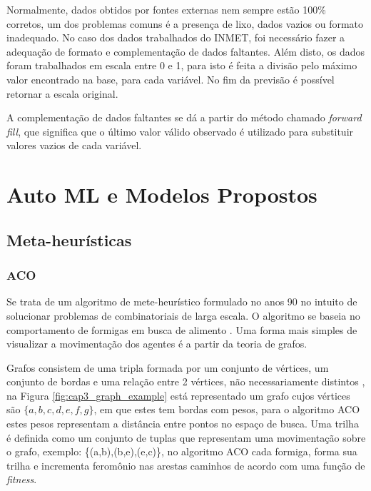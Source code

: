 Normalmente, dados obtidos por fontes externas nem sempre estão 100\% corretos, um dos problemas comuns é a presença de lixo, dados vazios ou formato inadequado. No caso dos dados trabalhados do INMET, foi necessário fazer a adequação de formato e complementação de dados faltantes. Além disto, os dados foram trabalhados em escala entre 0 e 1, para isto é feita a divisão pelo máximo valor encontrado na base, para cada variável. No fim da previsão é possível retornar a escala original.

A complementação de dados faltantes se dá a partir do método chamado \textit{forward fill}, que significa que o último valor válido observado é utilizado para substituir valores vazios de cada variável.

\section{Auto ML e Modelos Propostos}
\label{sec:auto_ml}

\subsection{Meta-heurísticas}

\subsubsection{ACO}
\label{subsec:aco}

Se trata de um algoritmo de mete-heurístico formulado no anos 90 \cite{dorigo1999ant} no intuito de solucionar problemas de combinatoriais de larga escala. O algoritmo se baseia no comportamento de formigas em busca de alimento \cite{dorigo2006ant}. Uma forma mais simples de visualizar a movimentação dos agentes é a partir da teoria de grafos.

Grafos consistem de uma tripla formada por um conjunto de vértices, um conjunto de bordas e uma relação entre 2 vértices, não necessariamente distintos \cite{west2001introduction}, na Figura \ref{fig:cap3_graph_example} está representado um grafo cujos vértices são $\{a, b, c, d, e, f, g\}$, em que estes tem bordas com pesos, para o algoritmo ACO estes pesos representam a distância entre pontos no espaço de busca. Uma trilha é definida como um conjunto de tuplas que representam uma movimentação sobre o grafo, exemplo: \{(a,b),(b,e),(e,c)\}, no algoritmo ACO cada formiga, forma sua trilha e incrementa feromônio nas arestas caminhos de acordo com uma função de \textit{fitness}. 

